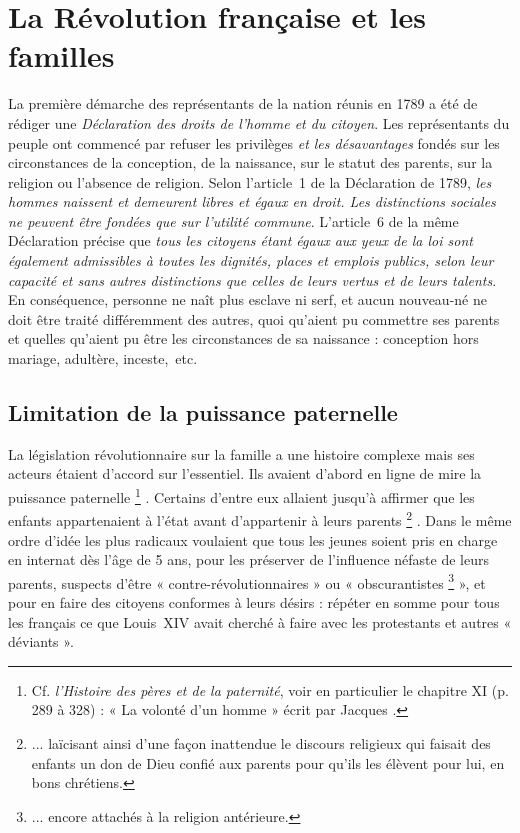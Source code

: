 

\chapter{La Révolution française et les familles}


%
 La première démarche des représentants de la nation réunis en 1789 a été de rédiger une \emph{Déclaration des droits de l'homme et du citoyen}. Les représentants du peuple ont commencé par refuser les privilèges \emph{et les désavantages} fondés sur les circonstances de la conception, de la naissance, sur le statut des parents, sur la religion ou l'absence de religion. Selon l'article~1 de la Déclaration de 1789, \emph{les hommes naissent et demeurent libres et égaux en droit. Les distinctions sociales ne peuvent être fondées que sur l'utilité commune}. L'article~6 de la même Déclaration précise que \emph{tous les citoyens étant égaux aux yeux de la loi sont également admissibles à toutes les dignités, places et emplois publics, selon leur capacité et sans autres distinctions que celles de leurs vertus et de leurs talents}. En conséquence, personne ne naît plus esclave ni serf, et aucun nouveau-né ne doit être traité différemment des autres, quoi qu'aient pu commettre ses parents et quelles qu'aient pu être les circonstances de sa naissance : conception hors mariage, adultère, inceste,~etc. 


\section{Limitation de la puissance paternelle}

 La législation révolutionnaire sur la famille a une histoire complexe mais ses acteurs étaient d'accord sur l'essentiel. Ils avaient d'abord en ligne de mire la puissance paternelle%
\footnote{Cf. \emph{l'Histoire des pères et de la paternité}, voir en particulier le chapitre XI (p. 289 à 328) : « La volonté d'un homme » écrit par Jacques .}%
. Certains d'entre eux allaient jusqu'à affirmer que les enfants appartenaient à l'état avant d'appartenir à leurs parents%
\footnote{... laïcisant ainsi d'une façon inattendue le discours religieux qui faisait des enfants un don de Dieu confié aux parents pour qu'ils les élèvent pour lui, en bons chrétiens.}%
. Dans le même ordre d'idée les plus radicaux voulaient que tous les jeunes soient pris en charge en internat dès l'âge de 5 ans, pour les préserver de l'influence néfaste de leurs parents, suspects d'être {« contre-révolutionnaires »} ou « {obscurantistes}%
\footnote{... encore attachés à la religion antérieure.} 
», et pour en faire des citoyens conformes à leurs désirs : répéter en somme pour tous les français ce que Louis~XIV avait cherché à faire avec les protestants et autres « déviants ».

